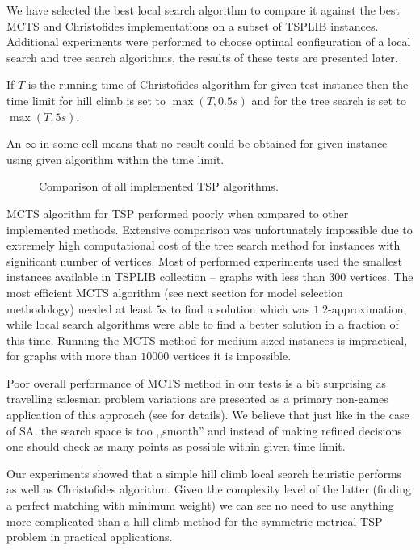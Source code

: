 We have selected the best local search algorithm to compare it against the best
MCTS and Christofides implementations on a subset of TSPLIB instances.
Additional experiments were performed to choose optimal configuration of a
local search and tree search algorithms, the results of these tests are presented
later.

If $T$ is the running time of Christofides algorithm for given test instance
then the time limit for hill climb is set to $\max(T, 0.5 s)$ and for the tree
search is set to $\max(T, 5 s)$.

An $\infty$ in some cell means that no result could be obtained for given
instance using given algorithm within the time limit.

\begin{figure}[ht]
  \centering
  
  \caption{Comparison of all implemented TSP algorithms.}
\end{figure}

MCTS algorithm for TSP performed poorly when compared to other implemented
methods. Extensive comparison was unfortunately impossible due to extremely
high computational cost of the tree search method for instances with
significant number of vertices. Most of performed experiments used the smallest
instances available in TSPLIB collection -- graphs with less than $300$
vertices. The most efficient MCTS algorithm (see next section for model
selection methodology) needed at least $5 s$ to find a solution which was
$1.2$-approximation, while local search algorithms were able to find a
better solution in a fraction of this time. Running the MCTS method
for medium-sized instances is impractical, for graphs with more than
$10000$ vertices it is impossible.

Poor overall performance of MCTS method in our tests is a bit surprising as
travelling salesman problem variations are presented as a primary non-games
application of this approach (see \cite{MCTSsurvey} for details). We believe
that just like in the case of SA, the search space is too ,,smooth'' and
instead of making refined decisions one should check as many points as possible
within given time limit.

Our experiments showed that a simple hill climb local search heuristic performs
as well as Christofides algorithm. Given the complexity level of the latter
(finding a perfect matching with minimum weight) we can see no need to use
anything more complicated than a hill climb method for the symmetric metrical
TSP problem in practical applications.

